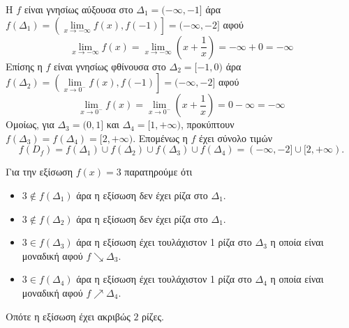 \documentclass[a4paper,11pt,twoside]{article}
\begin{document}
\begin{alist}[resume]
\item Η $f$ είναι γνησίως αύξουσα στο $\varDelta_1=(-\infty,-1]$ άρα $f(\varDelta_1)=\left(\lim\limits_{x\to-\infty}{f(x)},f(-1)\right]=(-\infty,-2]$ αφού
\[ \lim_{x\to -\infty}{f(x)}=\lim_{x\to-\infty}{\left(x+\frac{1}{x}\right)}=-\infty+0=-\infty \]
Επίσης η $f$ είναι γνησίως φθίνουσα στο $\varDelta_2=[-1,0)$ άρα $f(\varDelta_2)=\left(\lim\limits_{x\to0^-}{f(x)},f(-1)\right]=(-\infty,-2]$ αφού
\[ \lim_{x\to0^-}{f(x)}=\lim_{x\to0^-}{\left(x+\frac{1}{x}\right)}=0-\infty=-\infty \]
Ομοίως, για $\varDelta_3=(0,1]$ και $\varDelta_4=[1,+\infty)$, προκύπτουν $f(\varDelta_3)=f(\varDelta_4)=[2,+\infty)$. Επομένως η $f$ έχει σύνολο τιμών
\[f(D_f)=f(\varDelta_1)\cup f(\varDelta_2)\cup f(\varDelta_3)\cup f(\varDelta_4)=(-\infty,-2]\cup[2,+\infty).\]
\item Για την εξίσωση $f(x)=3$ παρατηρούμε ότι 
\begin{itemize}
\item $3\notin f(\varDelta_1)$ άρα η εξίσωση δεν έχει ρίζα στο $\varDelta_1$.
\item $3\notin f(\varDelta_2)$ άρα η εξίσωση δεν έχει ρίζα στο $\varDelta_1$.
\item $3\in f(\varDelta_3)$ άρα η εξίσωση έχει τουλάχιστον 1 ρίζα στο $\varDelta_3$ η οποία είναι μοναδική αφού $f\searrow\varDelta_3$.
\item $3\in f(\varDelta_4)$ άρα η εξίσωση έχει τουλάχιστον 1 ρίζα στο $\varDelta_4$ η οποία είναι μοναδική αφού $f\nearrow\varDelta_4$.
\end{itemize}
Οπότε η εξίσωση έχει ακριβώς $2$ ρίζες.
\end{alist}
\end{document}
